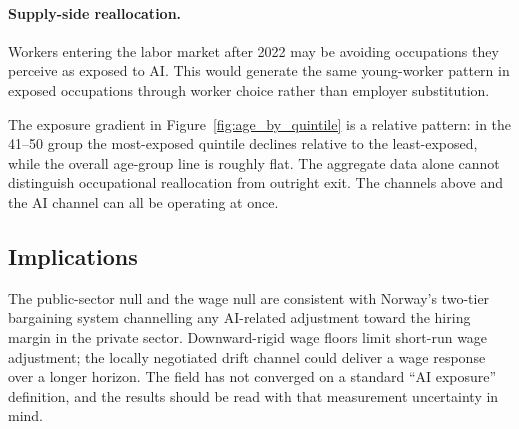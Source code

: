 \paragraph{Supply-side reallocation.} Workers entering the labor market after 2022 may be avoiding occupations they perceive as exposed to AI. This would generate the same young-worker pattern in exposed occupations through worker choice rather than employer substitution.

The exposure gradient in Figure~\ref{fig:age_by_quintile} is a relative pattern: in the 41--50 group the most-exposed quintile declines relative to the least-exposed, while the overall age-group line is roughly flat. The aggregate data alone cannot distinguish occupational reallocation from outright exit. The channels above and the AI channel can all be operating at once.


\subsection{Implications}\label{sec:discussion:implications}

The public-sector null and the wage null are consistent with Norway's two-tier bargaining system \citep{bhuller2022} channelling any AI-related adjustment toward the hiring margin in the private sector. Downward-rigid wage floors limit short-run wage adjustment; the locally negotiated drift channel could deliver a wage response over a longer horizon. The field has not converged on a standard ``AI exposure'' definition, and the results should be read with that measurement uncertainty in mind.
